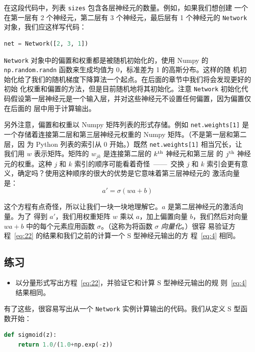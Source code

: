 在这段代码中，列表 \lstinline!sizes! 包含各层神经元的数量。例如，如果我们想创建
一个在第一层有 2 个神经元，第二层有 3 个神经元，最后层有 1 个神经元的
\lstinline!Network! 对象，我们应这样写代码：
\begin{lstlisting}[language=Python]
net = Network([2, 3, 1])
\end{lstlisting}

\lstinline!Network! 对象中的偏置和权重都是被随机初始化的，使用 Numpy 的
\lstinline!np.random.randn! 函数来生成均值为 0，标准差为 1 的高斯分布。这样的随
机初始化给了我们的随机梯度下降算法一个起点。在后面的章节中我们将会发现更好的初始
化权重和偏置的方法，但是目前随机地将其初始化。注意 \lstinline!Network! 初始化代
码假设第一层神经元是一个输入层，并对这些神经元不设置任何偏置，因为偏置仅在后面的
层中用于计算输出。

另外注意，偏置和权重以 Numpy 矩阵列表的形式存储。例如 \lstinline!net.weights[1]!
是一个存储着连接第二层和第三层神经元权重的 Numpy 矩阵。（不是第一层和第二层，因
  为 Python 列表的索引从 0 开始。）既然 \lstinline!net.weights[1]! 相当冗长，让
我们用 $w$ 表示矩阵。矩阵的 $w_{jk}$ 是连接第二层的 $k^{\rm th}$ 神经元和第三层
的 $j^{\rm th}$ 神经元的权重。这种 $j$ 和 $k$ 索引的顺序可能看着奇怪~——~交换 $j$
和 $k$ 索引会更有意义，确定吗？使用这种顺序的很大的优势是它意味着第三层神经元的
激活向量是：
\begin{equation}
  a' = \sigma(w a + b)
  \label{eq:22}\tag{22}
\end{equation}

这个方程有点奇怪，所以让我们一块一块地理解它。$a$ 是第二层神经元的激活向量。为了
得到 $a'$，我们用权重矩阵 $w$ 乘以 $a$，加上偏置向量 $b$，我们然后对向量 $w a
+b$ 中的每个元素应用函数 $\sigma$。（这称为将函数 $\sigma$ \emph{向量化}。）很容
易验证方程~\eqref{eq:22} 的结果和我们之前的计算一个 S 型神经元输出的方
程~\eqref{eq:4} 相同。

\subsection*{练习}

\begin{itemize}
\item 以分量形式写出方程~\eqref{eq:22}，并验证它和计算 S 型神经元输出的规
  则~\eqref{eq:4} 结果相同。
\end{itemize}

有了这些，很容易写出从一个 \lstinline!Network! 实例计算输出的代码。我们从定义 S
型函数开始：
\begin{lstlisting}[language=Python]
def sigmoid(z):
    return 1.0/(1.0+np.exp(-z))
\end{lstlisting}

